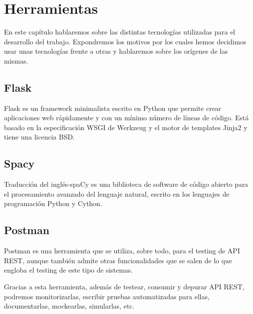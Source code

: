 \chapter{Herramientas}
\label{cap:herramientas}

En este capítulo hablaremos sobre las distintas tecnologías utilizadas para el desarrollo del trabajo. Expondremos los motivos por los cuales hemos decidimos usar unas tecnologías frente a otras y hablaremos sobre los
orígenes de las mismas.


\section{Flask}
Flask es un framework minimalista escrito en Python que permite crear aplicaciones web rápidamente y con un mínimo número de líneas de código. Está basado en la especificación WSGI de Werkzeug y el motor de templates Jinja2 y tiene una licencia BSD.
\section{Spacy}
Traducción del inglés-spaCy es una biblioteca de software de código abierto para el procesamiento avanzado del lenguaje natural, escrito en los lenguajes de programación Python y Cython.
\section{Postman}
Postman es una herramienta que se utiliza, sobre todo, para el testing de API REST, aunque también admite otras funcionalidades que se salen de lo que engloba el testing de este tipo de sistemas.

Gracias a esta herramienta, además de testear, consumir y depurar API REST, podremos monitorizarlas, escribir pruebas automatizadas para ellas, documentarlas, mockearlas, simularlas, etc.
